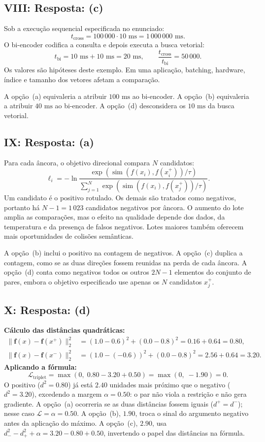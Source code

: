 \documentclass{dlproblemset}
\begin{document}
\subsection*{VIII: Resposta: (c)}
Sob a execução sequencial especificada no enunciado:
\[
  t_{\text{cross}}=100\,000\cdot10\text{ ms}=1\,000\,000\text{ ms}.
\]
O bi-encoder codifica a consulta e depois executa a busca vetorial:
\[
  t_{\text{bi}}=10\text{ ms}+10\text{ ms}=20\text{ ms},
  \qquad
  \frac{t_{\text{cross}}}{t_{\text{bi}}}=50\,000.
\]
Os valores são hipóteses deste exemplo. Em uma aplicação, batching, hardware,
índice e tamanho dos vetores afetam a comparação.

A opção~(a) equivaleria a atribuir $100\text{ ms}$ ao bi-encoder.
A opção~(b) equivaleria a atribuir $40\text{ ms}$ ao bi-encoder.
A opção~(d) desconsidera os $10\text{ ms}$ da busca vetorial.

\subsection*{IX: Resposta: (a)}
Para cada âncora, o objetivo direcional compara $N$ candidatos:
\[
  \ell_i=-\ln\frac{\exp(\operatorname{sim}(f(x_i),f(x_i^+))/\tau)}
    {\sum_{j=1}^{N}\exp(\operatorname{sim}(f(x_i),f(x_j^+))/\tau)}.
\]
Um candidato é o positivo rotulado. Os demais são tratados como negativos,
portanto há $N-1=1\,023$ candidatos negativos por âncora.
O aumento do lote amplia as comparações, mas o efeito na qualidade depende
dos dados, da temperatura e da presença de falsos negativos. Lotes maiores
também oferecem mais oportunidades de colisões semânticas.

A opção~(b) inclui o positivo na contagem de negativos.
A opção~(c) duplica a contagem, como se as duas direções fossem reunidas na perda de cada âncora.
A opção~(d) conta como negativos todos os outros $2N-1$ elementos do conjunto de pares,
embora o objetivo especificado use apenas os $N$ candidatos $x_j^+$.

\subsection*{X: Resposta: (d)}
\textbf{Cálculo das distâncias quadráticas:}
\begin{align*}
  \|\mathbf{f}(x) - \mathbf{f}(x^+)\|_2^2
    &= (1.0 - 0.6)^2 + (0.0 - 0.8)^2
     = 0.16 + 0.64 = 0.80, \\
  \|\mathbf{f}(x) - \mathbf{f}(x^-)\|_2^2
    &= (1.0 - (-0.6))^2 + (0.0 - 0.8)^2
     = 2.56 + 0.64 = 3.20.
\end{align*}
\textbf{Aplicando a fórmula:}
\[
  \mathcal{L}_{\text{triplet}}
    = \max(0,\; 0.80 - 3.20 + 0.50)
    = \max(0,\; -1.90)
    = 0.
\]
O positivo ($d^2 = 0.80$) já está $2.40$ unidades mais próximo que o negativo
($d^2 = 3.20$), excedendo a margem $\alpha = 0.50$: o par não viola a
restrição e não gera gradiente.
A opção~(a) ocorreria se as duas distâncias fossem iguais ($d^+ = d^-$); nesse
caso $\mathcal{L} = \alpha = 0.50$.
A opção~(b), $1.90$, troca o sinal do argumento negativo antes da aplicação do máximo.
A opção~(c), $2.90$, usa $d_-^2-d_+^2+\alpha=3.20-0.80+0.50$,
invertendo o papel das distâncias na fórmula.
\end{document}
